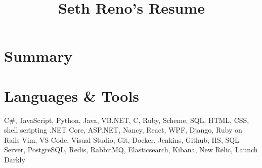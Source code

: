 \documentclass[11pt,letterpaper,final]{moderncv}
\title{Seth Reno's Resume}
\begin{document}
\maketitle
\section{Summary}

\section{Languages \& Tools} 
{C\#, JavaScript, Python, Java, VB.NET, C, Ruby, Scheme, SQL, HTML, CSS, shell scripting}
{.NET Core, ASP.NET, Nancy, React, WPF, Django, Ruby on Rails}
{Vim, VS Code, Visual Studio, Git, Docker, Jenkins, Github,  IIS, SQL
Server, PostgreSQL, Redis, RabbitMQ, Elasticsearch, Kibana, New Relic,
Launch Darkly }
\end{document}
